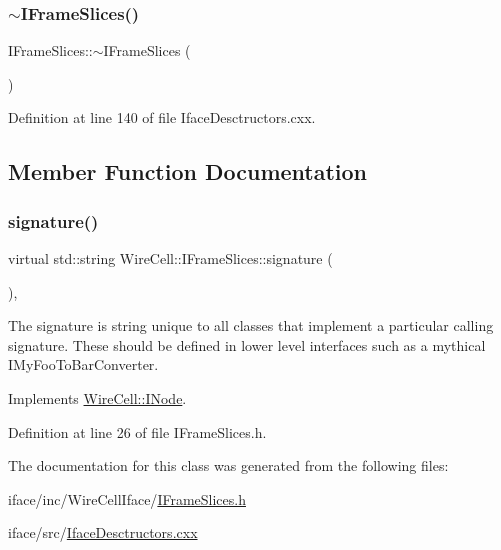 \subsubsection{\texorpdfstring{$\sim$\+I\+Frame\+Slices()}{~IFrameSlices()}}
{\footnotesize\ttfamily I\+Frame\+Slices\+::$\sim$\+I\+Frame\+Slices (\begin{DoxyParamCaption}{ }\end{DoxyParamCaption})\hspace{0.3cm}{\ttfamily [virtual]}}



Definition at line 140 of file Iface\+Desctructors.\+cxx.



\subsection{Member Function Documentation}
\mbox{\label{class_wire_cell_1_1_i_frame_slices_acd57c74cab5f5a7ec99fdd89f2bfdb50}} 
\subsubsection{\texorpdfstring{signature()}{signature()}}
{\footnotesize\ttfamily virtual std\+::string Wire\+Cell\+::\+I\+Frame\+Slices\+::signature (\begin{DoxyParamCaption}{ }\end{DoxyParamCaption})\hspace{0.3cm}{\ttfamily [inline]}, {\ttfamily [virtual]}}

The signature is string unique to all classes that implement a particular calling signature. These should be defined in lower level interfaces such as a mythical I\+My\+Foo\+To\+Bar\+Converter. 

Implements \hyperlink{class_wire_cell_1_1_i_node_a0b0763465adf5ba7febe8e378162b584}{Wire\+Cell\+::\+I\+Node}.



Definition at line 26 of file I\+Frame\+Slices.\+h.



The documentation for this class was generated from the following files\+:\begin{DoxyCompactItemize}
\item 
iface/inc/\+Wire\+Cell\+Iface/\hyperlink{_i_frame_slices_8h}{I\+Frame\+Slices.\+h}\item 
iface/src/\hyperlink{_iface_desctructors_8cxx}{Iface\+Desctructors.\+cxx}\end{DoxyCompactItemize}
